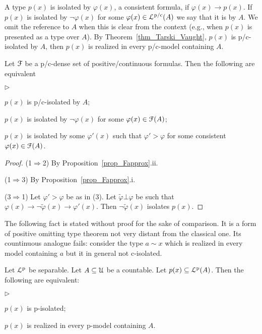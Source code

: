 \documentclass{amsproc}
\newcommand{\mylabel}[1]{{#1}\hfill}
\renewenvironment{itemize}
  {\begin{list}{$\triangleright$}{%
  \setlength{\parskip}{0mm}
  \setlength{\topsep}{.4\baselineskip}
  \setlength{\rightmargin}{0mm}
  \setlength{\listparindent}{0mm}
  \setlength{\itemindent}{0mm}
  \setlength{\labelwidth}{3ex}
  \setlength{\itemsep}{.2\baselineskip}
  \setlength{\parsep}{.2\baselineskip}
  \setlength{\partopsep}{0mm}
  \setlength{\labelsep}{1ex}
  \setlength{\leftmargin}{\labelwidth+\labelsep}
  \let\makelabel\mylabel}}{%
\end{list}}
\renewcommand*{\emph}[1]{%
   \smash{\tikz[baseline]\node[rectangle, fill=teal!25, rounded corners, inner xsep=0.5ex, inner ysep=0.2ex, anchor=base, minimum height = 2.7ex]{\strut #1};}}
\begin{document}
{A type $p(x)$ is isolated by $\varphi(x)$, a consistent formula, if $\varphi(x)\rightarrow p(x)$.
If $p(x)$ is isolated by $\neg\varphi(x)$ for some $\varphi(x)\in{\EuScript L}^{\rm p/c}(A)$ we say that it is \emph{p/c-isolated\/} by $A$.
We omit the reference to $A$ when this is clear from the context (e.g., when $p(x)$ is presented as a type over $A$).
By Theorem~\ref{thm_Tarski_Vaught}, $p(x)$ is p/c-isolated by $A$, then $p(x)$ is realized in every p/c-model containing $A$.

\begin{fact}\label{fact_isolation}
  Let ${\EuScript F}$ be a p/c-dense set of positive/continuous formulas.
  Then the following are equivalent
  \begin{itemize}
  \item[1.] $p(x)$ is p/c-isolated by $A$;
  \item[2.] $p(x)$ is isolated by $\neg\varphi(x)$ for some $\varphi(x)\in{\EuScript F}(A)$;
  \item[3.] $p(x)$ is isolated by some $\varphi'(x)$ such that  $\varphi'>\varphi$ for some consistent $\varphi(x)\in{\EuScript F}(A)$.
  \end{itemize}
\end{fact}

\begin{proof}
  (1$\Rightarrow$2) By Proposition~\ref{prop_Fapprox}.ii.

  (1$\Rightarrow$3) By Proposition~\ref{prop_Fapprox}.i.

  (3$\Rightarrow$1) Let $\varphi'>\varphi$ be as in (3). 
  Let $\tilde\varphi\bot\varphi$ be such that $\varphi(x)\rightarrow\neg\tilde\varphi(x)\rightarrow\varphi'(x)$. 
  Then $\neg\tilde\varphi(x)$ isolates $p(x)$.
\end{proof}

The following fact is stated without proof for the sake of comparison.
It is a form of positive omitting type theorem not very distant from the classical one.
Its countinuous analogue fails: consider the type $a\sim x$ which is realized in every model containing $a$ but it in general not c-isolated.

\begin{fact}
  Let ${\EuScript L}^{\rm p}$ be separable.
  Let $A\subseteq{\EuScript U}$ be a countable.
  Let $p(x)\subseteq{\EuScript L}^{\rm p}(A)$.
  Then the following are equivalent:
  \begin{itemize}
    \item[1.] $p(x)$ is p-isolated;
    \item[2.] $p(x)$ is realized in every p-model containing $A$.
  \end{itemize}
\end{fact}

}
\end{document}
